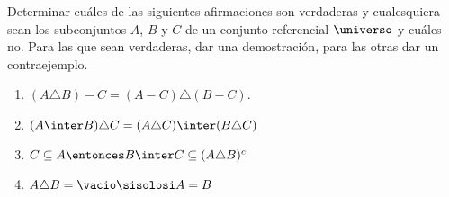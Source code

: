 \begin{enunciado}{\ejercicio}
  Determinar cuáles de las siguientes afirmaciones son verdaderas y
  cualesquiera sean los subconjuntos $A$, $B$ y $C$ de un conjunto
  referencial $\universo$ y cuáles no.
  Para las que sean verdaderas, dar una demostración, para las otras dar un contraejemplo.

  \begin{multicols}{2}
    \begin{enumerate}[label=\roman*)]
      \item $(A \triangle B) - C = (A-C) \triangle (B - C)$.
      \item $(A \inter B) \triangle C = (A \triangle C) \inter (B \triangle C)$
      \item $C \subseteq A \entonces B \inter C \subseteq (A \triangle B)^c$
      \item $A \triangle B = \vacio \sisolosi A = B$
    \end{enumerate}
  \end{multicols}

\end{enunciado}

